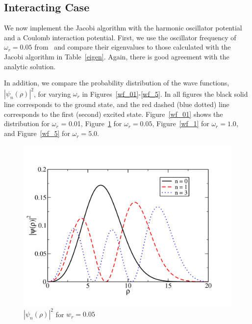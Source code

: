 \documentclass[prc,amsmath,twocolumn,superscriptaddress]{revtex4}
\begin{document}
\subsection{Interacting Case}
We now implement the Jacobi algorithm with the harmonic oscillator potential and a Coulomb interaction potential. First, we use the oscillator frequency of $\omega_r=0.05$ from~\cite{interact} and compare their eigenvalues to those calculated with the Jacobi algorithm in Table~\ref{eigen}. Again, there is good agreement with the analytic solution.

In addition, we compare the probability distribution of the wave functions, $|\psi_n(\rho)|^2$, for varying $\omega_r$ in Figures~\ref{wf_01}-\ref{wf_5}. In all figures the black solid line corresponds to the ground state, and the red dashed (blue dotted) line corresponds to the first (second) excited state. Figure~\ref{wf_01} shows the distribution for $\omega_r$ = 0.01, Figure~\ref{wf_05} for $\omega_r = 0.05$, Figure~\ref{wf_1} for $\omega_r = 1.0$, and Figure~\ref{wf_5} for $\omega_r = 5.0$.

\begin{figure}[b]
\includegraphics[scale=0.33]{wf_05.pdf}
\caption{$|\psi_n(\rho)|^2$ for $w_r = 0.05$}
\label{wf_05}
\end{figure}
\end{document}

